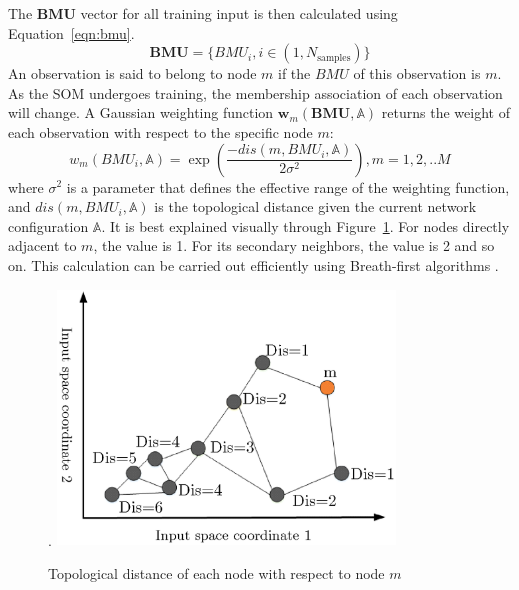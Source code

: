 \documentclass[review,3p]{elsarticle}
\renewcommand\[{\begin{equation}}
\renewcommand\]{\end{equation}}
\begin{document}
The $\mathbf{BMU}$ vector for all training input is then calculated using
Equation~\ref{eqn:bmu}.
\[
\mathbf{BMU} = \{BMU_i, i \in (1,N_\mathrm{samples})\}
\]
An observation is said to belong to node $m$ if the $BMU$ of this observation
is $m$. 
As the SOM undergoes training, the membership association of each observation will change. A Gaussian weighting function
$\mathbf{w}_m(\mathbf{ BMU},\mathbb A)$ returns the
weight of each observation with respect to the specific node $m$:
\begin{equation}
{w_m}\left( {BM{U_i},\mathbb A} \right) = \exp \left( {\frac{{ - dis\left( {m,BM{U_i},\mathbb A} \right)}}{{2{\sigma ^2}}}} \right),m = 1,2,..M
\label{eqn:gsmms_weight}
\end{equation}
where $\sigma^2$ is a parameter that defines the effective range of the
weighting function, and $dis(m,BMU_i,\mathbb A)$ is the topological distance
given the current network configuration $\mathbb A$.  It is best explained visually through Figure~\ref{fig:gsmms_topdis}. For nodes directly adjacent to $m$, the value is 1. For its secondary neighbors, the value is 2 and so on. 
This calculation can be carried out efficiently using Breath-first algorithms \cite{Russell2009}. 
\begin{figure}.
  \centering
  \includegraphics[width=0.8\textwidth]{figures/gsmms/gsmms_topdis.eps}\\
  \caption{Topological distance of each node with respect to node $m$}\label{fig:gsmms_topdis}
\end{figure}
\end{document}
